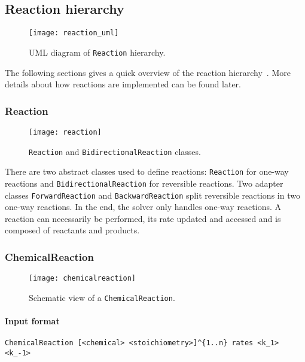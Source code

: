 
\subsection{Reaction hierarchy}

\begin{figure}[!h]
  \centering
  \texttt{[image: reaction\_uml]}
  \caption{UML diagram of \texttt{Reaction} hierarchy.}
  \label{fig:reaction_uml}
\end{figure}

The following sections gives a quick overview of the reaction hierarchy~. More details about how reactions are implemented can be found later.

\subsubsection{Reaction}

\begin{figure}[!h]
  \centering
  \texttt{[image: reaction]}
  \caption{\texttt{Reaction} and \texttt{BidirectionalReaction} classes.}
  \label{fig:reaction}
\end{figure}

There are two abstract classes used to define reactions: \texttt{Reaction} for one-way reactions and \texttt{BidirectionalReaction} for reversible reactions. Two adapter classes \texttt{ForwardReaction} and \texttt{BackwardReaction} split reversible reactions in two one-way reactions. In the end, the solver only handles one-way reactions. A reaction can necessarily be performed, its rate updated and accessed and is composed of reactants and products.

\subsubsection{ChemicalReaction}

\begin{figure}[!h]
  \centering
  \texttt{[image: chemicalreaction]}
  \caption{Schematic view of a \texttt{ChemicalReaction}.}
  \label{fig:chemical_reaction}
\end{figure}

\paragraph{Input format}
\begin{verbatim}
ChemicalReaction [<chemical> <stoichiometry>]^{1..n} rates <k_1> <k_-1>
\end{verbatim}

